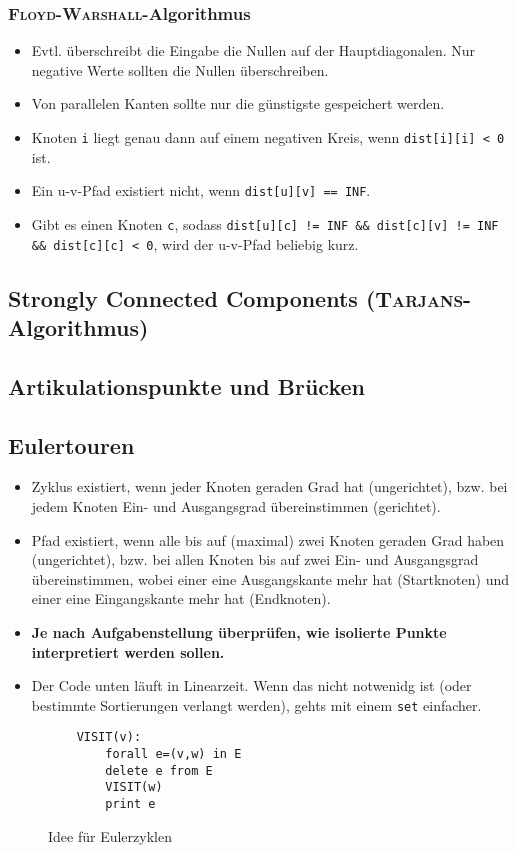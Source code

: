\subsubsection{\textsc{Floyd-Warshall}-Algorithmus}

\begin{itemize}
	\item Evtl. überschreibt die Eingabe die Nullen auf der Hauptdiagonalen.
	Nur negative Werte sollten die Nullen überschreiben.
	\item Von parallelen Kanten sollte nur die günstigste gespeichert werden.
	\item Knoten \lstinline{i} liegt genau dann auf einem negativen Kreis, wenn \lstinline{dist[i][i] < 0} ist.
	\item Ein u-v-Pfad existiert nicht, wenn \lstinline{dist[u][v] == INF}.
	\item Gibt es einen Knoten \lstinline{c}, sodass \lstinline{dist[u][c] != INF && dist[c][v] != INF && dist[c][c] < 0}, wird der u-v-Pfad beliebig kurz.
\end{itemize}

\subsection{Strongly Connected Components (\textsc{Tarjans}-Algorithmus)}


\subsection{Artikulationspunkte und Brücken}


\subsection{Eulertouren}
\begin{itemize}
	\item Zyklus existiert, wenn jeder Knoten geraden Grad hat (ungerichtet), bzw. bei jedem Knoten Ein- und Ausgangsgrad übereinstimmen (gerichtet).
	\item Pfad existiert, wenn alle bis auf (maximal) zwei Knoten geraden Grad haben (ungerichtet), bzw. bei allen Knoten bis auf zwei Ein- und Ausgangsgrad übereinstimmen, wobei einer eine Ausgangskante mehr hat (Startknoten) und einer eine Eingangskante mehr hat (Endknoten).
	\item \textbf{Je nach Aufgabenstellung überprüfen, wie isolierte Punkte interpretiert werden sollen.}
	\item Der Code unten läuft in Linearzeit.
	Wenn das nicht notwenidg ist (oder bestimmte Sortierungen verlangt werden), gehts mit einem \lstinline{set} einfacher.
\end{itemize}
\begin{figure}[h]
	\begin{lstlisting}
	VISIT(v):
		forall e=(v,w) in E
		delete e from E
		VISIT(w)
		print e
	\end{lstlisting}
	\caption{Idee für Eulerzyklen}
\end{figure}

